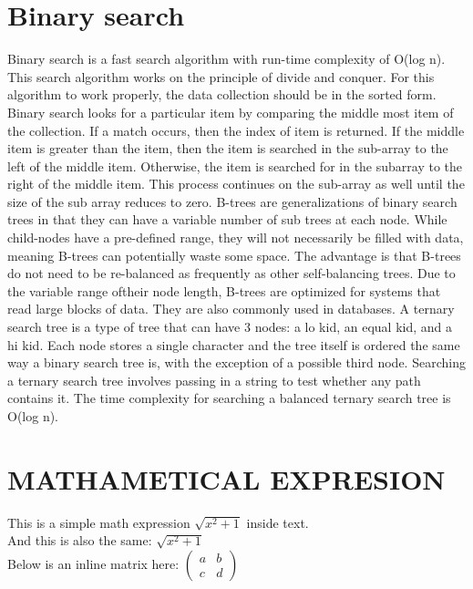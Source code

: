 \documentclass{article}
\begin{document}
\section*{\textbf{Binary search}}
Binary search is a fast search algorithm with run-time complexity of Ο(log n). This search algorithm works
on the principle of divide and conquer. For this
algorithm to work properly, the data collection should
be in the sorted form.
Binary search looks for a particular item by
comparing the middle most item of the collection. If a
match occurs, then the index of item is returned. If the
middle item is greater than the item, then the item is
searched in the sub-array to the left of the middle
item. Otherwise, the item is searched for in the subarray to the right of the middle item. This process
continues on the sub-array as well until the size of the
sub array reduces to zero. B-trees are generalizations
of binary search trees in that they can have a variable
number of sub trees at each node. While child-nodes
have a pre-defined range, they will not necessarily be
filled with data, meaning B-trees can potentially waste
some space. The advantage is that B-trees do not need
to be re-balanced as frequently as other self-balancing
trees.
Due to the variable range oftheir node length, B-trees
are optimized for systems that read large blocks of
data. They are also commonly used in databases. A
ternary search tree is a type of tree that can have 3
nodes: a lo kid, an equal kid, and a hi kid. Each node
stores a single character and the tree itself is ordered
the same way a binary search tree is, with the
exception of a possible third node. Searching a ternary
search tree involves passing in a string to test whether
any path contains it. The time complexity for
searching a balanced ternary search tree is O(log n).
\section*{MATHAMETICAL EXPRESION}
This is a simple math expression \(\sqrt{x^2+1}\) inside text. \\
And this is also the same: 
\begin{math}
\sqrt{x^2+1}
\end{math} \\
Below is an inline matrix here:
$\begin{pmatrix}
  a & b\\ 
  c & d
\end{pmatrix}$
\end{document}

